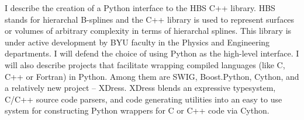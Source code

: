 I describe the creation of a Python interface to the HBS C++ library. HBS stands for hierarchal B-splines and the C++ library is used to represent surfaces or volumes of arbitrary complexity in terms of hierarchal splines. This library is under active development by BYU faculty in the Physics and Engineering departments. I will defend the choice of using Python as the high-level interface. I will also describe projects that facilitate wrapping compiled languages (like C, C++ or Fortran) in Python. Among them are SWIG, Boost.Python, Cython, and a relatively new project -- XDress. XDress blends an expressive typesystem, C/C++ source code parsers, and code generating utilities into an easy to use system for constructing Python wrappers for C or C++ code via Cython.
